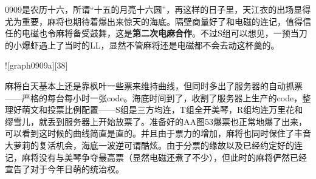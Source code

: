 
0909是农历十六，所谓“十五的月亮十六圆”，再这样的日子里，天江衣的出场显得尤为重要，麻将也期待着爆出来惊天的海底。隔壁商量好了和电磁的连记，值得信任的电磁也令麻将备受鼓舞，这是\textbf{第二次电麻合作}。不过S组可以想见，一预当刀的小爆虾遇上了当时的LL，显然不管麻将还是电磁都不会去动这杯羹的。

![graph0909a][38]

麻将白天基本上还是靠枫叶一些票来维持曲线，但同时多出了服务器的自动抓票——严格的每台每小时一张code。海底时间到了，收割了服务器上生产的code，整理好萌文和投票比例配置——S组是三方均连，T组全开美琴，R组均连万里花和缪雪儿，就丢到服务器上开始放票了。准备好的AA图53爆票也正常地爆了出来，可以看到这时候的曲线简直是直的。并且由于票力的增加，麻将也同时保住了丰音大萝莉的复活机会，海底一波逆可谓酷炫。由于分票的缘故以及已经约定好的连记，麻将没有与美琴争夺最高票（显然电磁还煮了不少），但此时的麻将俨然已经宣告了对于今年日萌的统治权。

